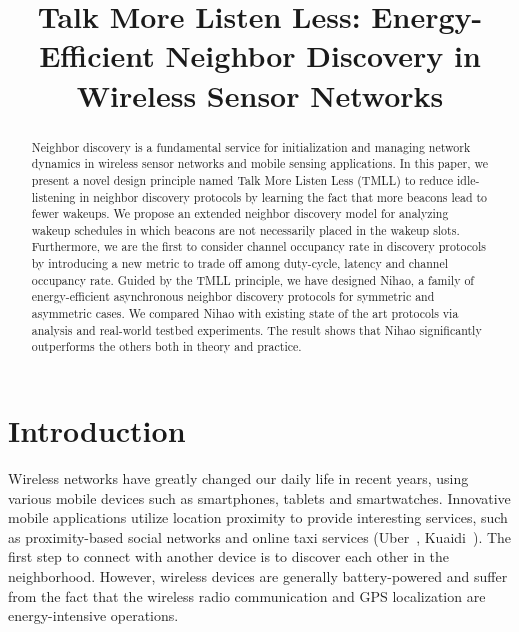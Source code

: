 \documentclass[conference]{IEEEtran}
\begin{document}
\title{Talk More Listen Less: Energy-Efficient Neighbor Discovery in Wireless Sensor Networks}
\author{
}


\maketitle

\begin{abstract}
Neighbor discovery is a fundamental service for initialization and managing network dynamics in wireless sensor networks and mobile sensing applications.
In this paper, we present a novel design principle named Talk More Listen Less (TMLL) to reduce idle-listening in neighbor discovery protocols by learning the fact that more beacons lead to fewer wakeups.
We propose an extended neighbor discovery model for analyzing wakeup schedules in which beacons are not necessarily placed in the wakeup slots.
Furthermore, we are the first to consider channel occupancy rate in discovery protocols by introducing a new metric to trade off among duty-cycle, latency and channel occupancy rate.
Guided by the TMLL principle, we have designed Nihao, a family of energy-efficient asynchronous neighbor discovery protocols for symmetric and asymmetric cases.
We compared Nihao with existing state of the art protocols via analysis and real-world testbed experiments.
The result shows that Nihao significantly outperforms the others both in theory and practice.
\end{abstract}



\IEEEpeerreviewmaketitle

\section{Introduction}
Wireless networks have greatly changed our daily life in recent years,
using various mobile devices such as smartphones, tablets and smartwatches.
Innovative mobile applications utilize location proximity to provide interesting services,
such as proximity-based social networks and online taxi services (Uber~\cite{uber}, Kuaidi~\cite{kuaidi}).
The first step to connect with another device is to discover each other in the neighborhood.
However, wireless devices are generally battery-powered and suffer from the fact that 
the wireless radio communication and GPS localization are energy-intensive operations.
\end{document}
